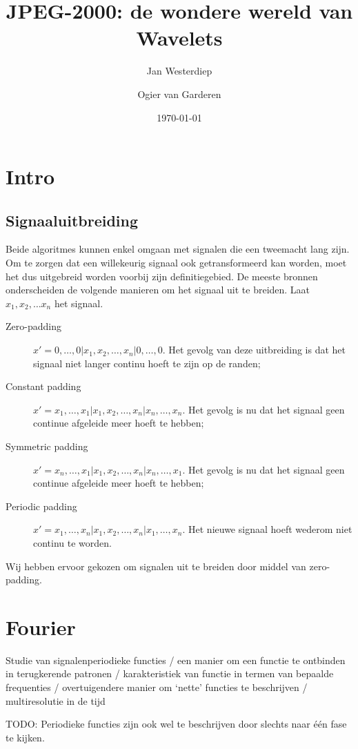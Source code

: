 \documentclass[11pt]{report}
\title{JPEG-2000: de wondere wereld van Wavelets}
\date{\today}
\author{Jan Westerdiep \and Ogier van Garderen}
\theoremstyle{plain}
\theoremstyle{remark}
\begin{document}
\maketitle
\tableofcontents 
\newpage
\chapter{Intro}
\section{Signaaluitbreiding}
Beide algoritmes kunnen enkel omgaan met signalen die een tweemacht lang zijn. Om te zorgen dat een willekeurig signaal ook getransformeerd kan worden, moet het dus uitgebreid worden voorbij zijn definitiegebied. De meeste bronnen onderscheiden de volgende manieren om het signaal uit te breiden. Laat $x_1, x_2, \ldots x_n$ het signaal.
\begin{description}
	\item[Zero-padding] $x' = 0, \ldots, 0| x_1, x_2, \ldots, x_n| 0, \ldots, 0$. Het gevolg van deze uitbreiding is dat het signaal niet langer continu hoeft te zijn op de randen;
	\item[Constant padding] $x' = x_1, \ldots, x_1| x_1, x_2, \ldots, x_n| x_n, \ldots, x_n$. Het gevolg is nu dat het signaal geen continue afgeleide meer hoeft te hebben; 
	\item[Symmetric padding] $x' = x_n, \ldots, x_1| x_1, x_2, \ldots, x_n| x_n, \ldots, x_1$. Het gevolg is nu dat het signaal geen continue afgeleide meer hoeft te hebben; 
	\item[Periodic padding] $x' = x_1, \ldots, x_n| x_1, x_2, \ldots, x_n| x_1, \ldots, x_n$. Het nieuwe signaal hoeft wederom niet continu te worden.
\end{description}
Wij hebben ervoor gekozen om signalen uit te breiden door middel van zero-padding.


\iffalse
\chapter{Fourier}

Studie van signalenperiodieke functies / 
een manier om een functie te ontbinden in terugkerende patronen /
karakteristiek van functie in termen van bepaalde frequenties /
overtuigendere manier om `nette' functies te beschrijven /
multiresolutie in de tijd

TODO: Periodieke functies zijn ook wel te beschrijven door slechts naar \'e\'en fase te kijken.
\end{document}
